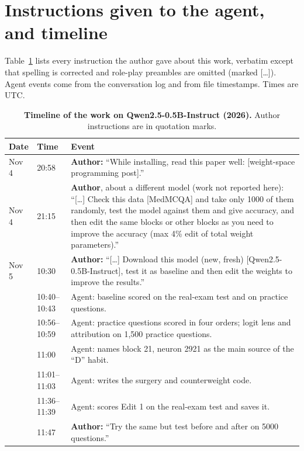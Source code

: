 \documentclass[11pt]{article}
\begin{document}



\clearpage
\appendix
\section{Instructions given to the agent, and timeline}
\label{app:prompts}

Table~\ref{tab:timeline} lists every instruction the author gave about this work, verbatim except that spelling is corrected and role-play preambles are omitted (marked [\ldots]). Agent events come from the conversation log and from file timestamps. Times are UTC.

\begin{table}[!ht]
\centering\small
\caption{\textbf{Timeline of the work on Qwen2.5-0.5B-Instruct (2026).} Author instructions are in quotation marks.}
\label{tab:timeline}
\begin{tabular}{@{}l l p{}@{}}
\toprule
Date & Time & Event \\
\midrule
Nov 4 & 20:58 & \textbf{Author:} ``While installing, read this paper well: [weight-space programming post].'' \\
Nov 4 & 21:15 & \textbf{Author}, about a different model (work not reported here): ``[\ldots] Check this data [MedMCQA] and take only 1000 of them randomly, test the model against them and give accuracy, and then edit the same blocks or other blocks as you need to improve the accuracy (max 4\% edit of total weight parameters).'' \\
Nov 5 & 10:30 & \textbf{Author:} ``[\ldots] Download this model (new, fresh) [Qwen2.5-0.5B-Instruct], test it as baseline and then edit the weights to improve the results.'' \\
 & 10:40--10:43 & Agent: baseline scored on the real-exam test and on practice questions. \\
 & 10:56--10:59 & Agent: practice questions scored in four orders; logit lens and attribution on 1{,}500 practice questions. \\
 & 11:00 & Agent: names block 21, neuron 2921 as the main source of the ``D'' habit. \\
 & 11:01--11:03 & Agent: writes the surgery and counterweight code. \\
 & 11:36--11:39 & Agent: scores Edit 1 on the real-exam test and saves it. \\
 & 11:47 & \textbf{Author:} ``Try the same but test before and after on 5000 questions.'' \\

\end{tabular}
\end{table}
\end{document}
